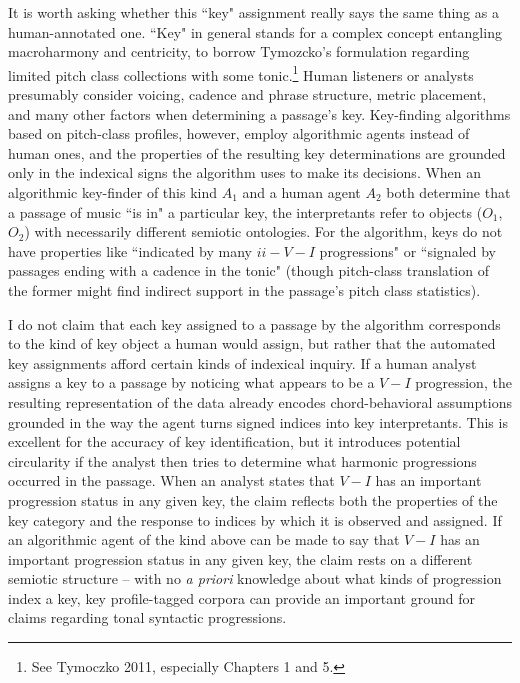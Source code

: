It is worth asking whether this ``key" assignment really says the same thing as a human-annotated one.  ``Key" in general stands for a complex concept entangling macroharmony and centricity, to borrow Tymozcko's formulation regarding limited pitch class collections with some tonic.\footnote{See Tymoczko 2011, especially Chapters 1 and 5.}  Human listeners or analysts presumably consider voicing, cadence and phrase structure, metric placement, and many other factors when determining a passage's key.  Key-finding algorithms based on pitch-class profiles, however, employ algorithmic agents instead of human ones, and the properties of the resulting key determinations are grounded only in the indexical signs the algorithm uses to make its decisions.  When an algorithmic key-finder of this kind $A_1$ and a human agent $A_2$ both determine that a passage of music ``is in" a particular key, the interpretants refer to objects ($O_1$, $O_2$) with necessarily different semiotic ontologies.  For the algorithm, keys do not have properties like ``indicated by many $ii-V-I$ progressions" or ``signaled by passages ending with a cadence in the tonic" (though pitch-class translation of the former might find indirect support in the passage's pitch class statistics).

I do not claim that each key assigned to a passage by the algorithm corresponds to the kind of key object a human would assign, but rather that the automated key assignments afford certain kinds of indexical inquiry.  If a human analyst assigns a key to a passage by noticing what appears to be a $V-I$ progression, the resulting representation of the data already encodes chord-behavioral assumptions grounded in the way the agent turns signed indices into key interpretants.  This is excellent for the accuracy of key identification, but it introduces potential circularity if the analyst then tries to determine what harmonic progressions occurred in the passage.  When an analyst states that $V-I$ has an important progression status in any given key, the claim reflects both the properties of the key category and the response to indices by which it is observed and assigned.  If an algorithmic agent of the kind above can be made to say that $V-I$ has an important progression status in any given key, the claim rests on a different semiotic structure -- with no \emph{a priori} knowledge about what kinds of progression index a key, key profile-tagged corpora can provide an important ground for claims regarding tonal syntactic progressions.

